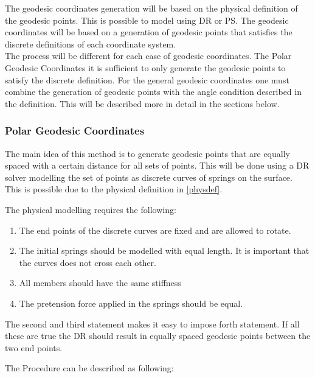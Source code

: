 The geodesic coordinates generation will be based on the physical definition of the geodesic points. This is possible to model using DR or PS. The geodesic coordinates will be based on a generation of geodesic points that satisfies the discrete definitions of each coordinate system.\\
The process will be different for each case of geodesic coordinates. The Polar Geodesic Coordinates it is sufficient to only generate the geodesic points to satisfy the discrete definition. For the general geodesic coordinates one must combine the generation of geodesic points with the angle condition described in the definition. This will be described more in detail in the sections below.



\subsubsection{Polar Geodesic Coordinates}

The main idea of this method is to generate geodesic points that are equally spaced with a certain distance for all sets of points. This will be done using a DR solver modelling the set of points as discrete curves of springs on the surface. This is possible due to the physical definition in \ref{physdef}. 

The physical modelling requires the following:
\begin{enumerate}
\item The end points of the discrete curves are fixed and are allowed to rotate.
\item The initial springs should be modelled with equal length. It is important that the curves does not cross each other.
\item All members should have the same stiffness
\item The pretension force applied in the springs should be equal.
\end{enumerate}

The second and third statement makes it easy to impose forth statement. If all these are true the DR should result in equally spaced geodesic points between the two end points.

\vspace{5mm}

The Procedure can be described as following:

